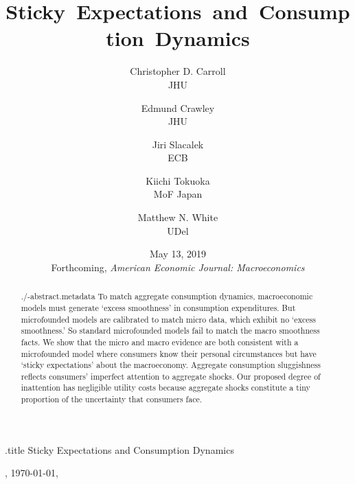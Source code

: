 \documentclass[titlepage]{\econtex}
\begin{document}

\begin{adjustwidth}{-1em}{-1em}

\begin{verbatimwrite}{\jobname.title}
Sticky Expectations and Consumption Dynamics
\end{verbatimwrite}

\hfill{\tiny \jobname, \today, \currenttime}

\title{Sticky~Expectations~and~Consumption~Dynamics}

{
\author{
  Christopher D. Carroll\authNum \\ {\small JHU}
  \and
  Edmund Crawley\authNum   \\ {\small JHU}
  \and
  Jiri Slacalek\authNum    \\ {\small ECB}
  \and
  Kiichi Tokuoka\authNum   \\ {\small MoF Japan}
  \and
  Matthew N. White\authNum \\ {\small UDel}
}
} 



\date{May 13, 2019 \\ \large{Forthcoming, \textit{American Economic Journal: Macroeconomics}}}
\maketitle

\hypertarget{Abstract}{} 
\begin{abstract}
  \begin{verbatimwrite}{./\jobname-abstract.metadata}
   To match aggregate consumption dynamics, macroeconomic models must generate `excess smoothness' in consumption expenditures.   But microfounded models are calibrated to match micro data, which exhibit no `excess smoothness.' So standard microfounded models fail to match the macro smoothness facts.  We show that the micro and macro evidence are both consistent with a microfounded model where consumers know their personal circumstances but have `sticky expectations' about the macroeconomy.  Aggregate consumption sluggishness reflects consumers' imperfect attention to aggregate shocks. Our proposed degree of inattention has negligible utility costs because aggregate shocks constitute a tiny proportion of the uncertainty that consumers face.
  \end{verbatimwrite}
  
\end{abstract}


\end{adjustwidth}
\end{document}
